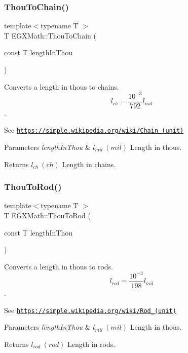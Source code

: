 \subsubsection{\texorpdfstring{Thou\+To\+Chain()}{ThouToChain()}}
{\footnotesize\ttfamily template$<$typename T $>$ \\
T E\+G\+X\+Math\+::\+Thou\+To\+Chain (\begin{DoxyParamCaption}\item[{const T}]{length\+In\+Thou }\end{DoxyParamCaption})}



Converts a length in thous to chains. \[ l_{ch}= \frac{10^{-3}}{792} l_{mil} \]. 

See \href{https://simple.wikipedia.org/wiki/Chain_(unit)}{\tt https\+://simple.\+wikipedia.\+org/wiki/\+Chain\+\_\+(unit)} 
\begin{DoxyParams}{Parameters}
{\em length\+In\+Thou} & $ l_{mil}\ (mil)$ Length in thous. \\
\hline
\end{DoxyParams}
\begin{DoxyReturn}{Returns}
$ l_{ch}\ (ch)$ Length in chains. 
\end{DoxyReturn}
\mbox{\label{group___e_g_x_math-_conversions-_length_conversions-_imperial-_thou-_surveyors_ga904d9983041eecd1dbcc92d29e21d5f3}} 
\subsubsection{\texorpdfstring{Thou\+To\+Rod()}{ThouToRod()}}
{\footnotesize\ttfamily template$<$typename T $>$ \\
T E\+G\+X\+Math\+::\+Thou\+To\+Rod (\begin{DoxyParamCaption}\item[{const T}]{length\+In\+Thou }\end{DoxyParamCaption})}



Converts a length in thous to rods. \[ l_{rod}= \frac{10^{-3}}{198} l_{mil} \]. 

See \href{https://simple.wikipedia.org/wiki/Rod_(unit)}{\tt https\+://simple.\+wikipedia.\+org/wiki/\+Rod\+\_\+(unit)} 
\begin{DoxyParams}{Parameters}
{\em length\+In\+Thou} & $ l_{mil}\ (mil)$ Length in thous. \\
\hline
\end{DoxyParams}
\begin{DoxyReturn}{Returns}
$ l_{rod}\ (rod)$ Length in rods. 
\end{DoxyReturn}
